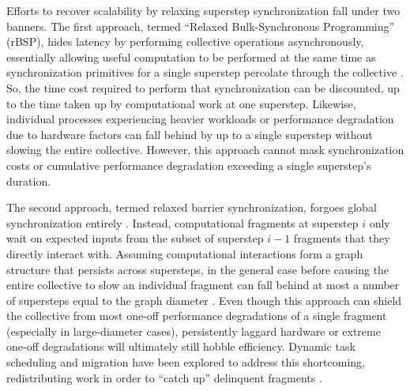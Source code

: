 Efforts to recover scalability by relaxing superstep synchronization fall under two banners.
The first approach, termed ``Relaxed Bulk-Synchronous Programming'' (rBSP), hides latency by performing collective operations asynchronously, essentially allowing useful computation to be performed at the same time as synchronization primitives for a single superstep percolate through the collective \cite{heroux2014toward}.
So, the time cost required to perform that synchronization can be discounted, up to the time taken up by computational work at one superstep.
Likewise, individual processes experiencing heavier workloads or performance degradation due to hardware factors can fall behind by up to a single superstep without slowing the entire collective.
However, this approach cannot mask synchronization costs or cumulative performance degradation exceeding a single superstep's duration.

The second approach, termed relaxed barrier synchronization, forgoes global synchronization entirely \cite{kim1998relaxed}.
Instead, computational fragments at superstep $i$ only wait on expected inputs from the subset of superstep $i-1$ fragments that they directly interact with.
Assuming computational interactions form a graph structure that persists across supersteps, in the general case before causing the entire collective to slow an individual fragment can fall behind at most a number of supersteps equal to the graph diameter \cite{gamell2015local}.
Even though this approach can shield the collective from most one-off performance degradations of a single fragment (especially in large-diameter cases), persistently laggard hardware or extreme one-off degradations will ultimately still hobble efficiency.
Dynamic task scheduling and migration have been explored to address this shortcoming, redistributing work in order to ``catch up'' delinquent fragments \cite{acun2014parallel}.

